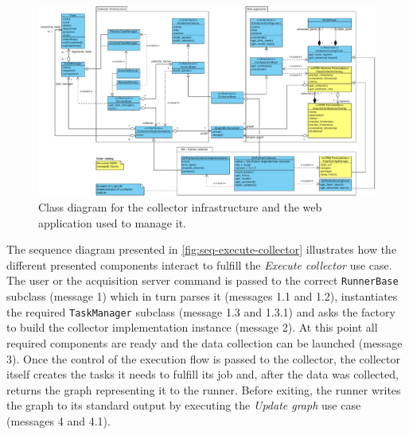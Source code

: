 \begin{figure}[p] 
  \centering
  \includegraphics[height=0.93\linewidth,angle=90,origin=c]{images/diagrams/class-collector}
  \caption[Class diagram for the data collection infrastructure.]{Class diagram for the collector infrastructure and the web application used to manage it.}
  \label{fig:class-collector}
\end{figure}

The sequence diagram presented in \vref{fig:seq-execute-collector} illustrates how the different presented components interact to fulfill the \emph{Execute collector} use case. The user or the acquisition server command is passed to the correct \texttt{Runner\BreakableSlash{}Base} subclass (message 1) which in turn parses it (messages 1.1 and 1.2), instantiates the required \texttt{TaskManager} subclass (message 1.3 and 1.3.1) and asks the factory to build the collector implementation instance (message 2). At this point all required components are ready and the data collection can be launched (message 3). Once the control of the execution flow is passed to the collector, the collector itself creates the tasks it needs to fulfill its job and, after the data was collected, returns the graph representing it to the runner. Before exiting, the runner writes the graph to its standard output by executing the \emph{Update graph} use case (messages 4 and 4.1).

